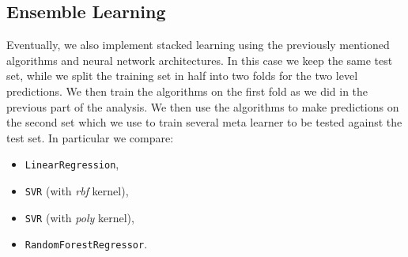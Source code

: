 \subsection{Ensemble Learning}
    Eventually, we also implement stacked learning using the previously mentioned algorithms and neural network architectures. In this case we keep the same test set, while we split the training set in half into two folds for the two level predictions. We then train the algorithms on the first fold as we did in the previous part of the analysis. We then use the algorithms to make predictions on the second set which we use to train several meta learner to be tested against the test set. In particular we compare:
    \begin{itemize}
        \item \texttt{LinearRegression},
        \item \texttt{SVR} (with \textit{rbf} kernel),
        \item \texttt{SVR} (with \textit{poly} kernel),
        \item \texttt{RandomForestRegressor}.
    \end{itemize}